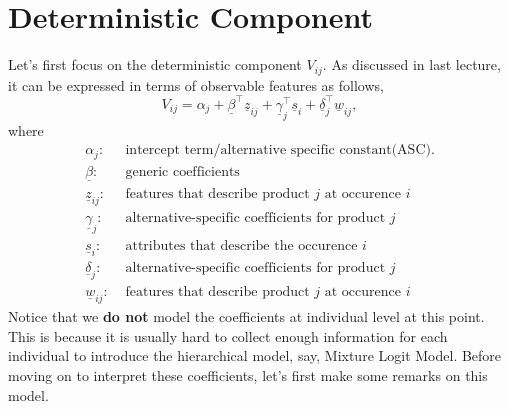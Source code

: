 \documentclass[11pt]{article}
\begin{document}
\section{Deterministic Component}
Let's first focus on the deterministic component $V_{ij}$. As discussed in last lecture, it can be expressed in terms of observable features as follows,
\begin{equation*}
V_{ij} = \alpha_j + \underline{\beta}^\top \underline{z}_{ij} + \underline{\gamma}_j^\top \underline{s}_i + \underline{\delta}_j^\top \underline{w}_{ij},
\end{equation*}
where
\begin{align*}
\alpha_j: &\text{ intercept term/alternative specific constant(ASC).}\\
\underline{\beta}: &\text{ generic coefficients}\\
\underline{z}_{ij}: &\text{ features that describe product $j$ at occurence $i$}\\
\underline{\gamma}_j: &\text{ alternative-specific coefficients for product $j$}\\
\underline{s}_i: &\text{ attributes that describe the occurence $i$}\\
\underline{\delta}_j: &\text{ alternative-specific coefficients for product $j$}\\
\underline{w}_{ij}: &\text{ features that describe product $j$ at occurence $i$}
\end{align*}
Notice that we \textbf{do not} model the coefficients at individual level at this point. This is because it is usually hard to collect enough information for each individual to introduce the hierarchical model, say, Mixture Logit Model. Before moving on to interpret these coefficients, let's first make some remarks on this model.
\end{document}
